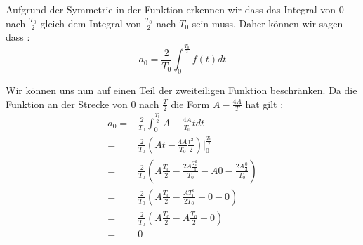 \documentclass{article}
\begin{document}
Aufgrund der Symmetrie in der Funktion erkennen wir dass das Integral von $0$ nach $\frac{T_0}{2}$ gleich dem Integral von $\frac{T_0}{2}$ nach $T_0$ sein muss. Daher können wir sagen dass :
\begin{equation}
    a_0=\frac{2}{T_0}\int_{0}^{\frac{T_0}{2}}f(t)dt 
\end{equation}

Wir können uns nun auf einen Teil der zweiteiligen Funktion beschränken. Da die Funktion an der Strecke von $0$ nach $\frac{T}{2}$ die Form $A-\frac{4A}{T}$ hat gilt :
\begin{eqnarray*}
    a_0=&\frac{2}{T_0}\int_{0}^{\frac{T_0}{2}}A-\frac{4A}{T_0}tdt \\
    =&\frac{2}{T_0}(At-\frac{4A}{T_0}\frac{t^2}{2})\big |_0^{\frac{T_0}{2}}\\
    =&\frac{2}{T_0}(A\frac{T_0}{2}-\frac{2A\frac{T_0^2}{4}}{T_0}-A0-\frac{2A\frac{0}{4}}{T_0})\\
    =&\frac{2}{T_0}(A\frac{T_0}{2}-\frac{AT_0^2}{2T_0}-0-0)\\
    =&\frac{2}{T_0}(A\frac{T_0}{2}-A\frac{T_0}{2}-0) \\ =& \underline{0}
\end{eqnarray*}

\pagebreak
\end{document}
